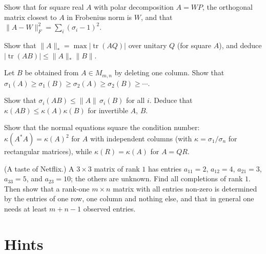 \begin{exercise}[$\star\star$]\label{linear:ex:nearestorth}
Show that for square real $A$ with polar decomposition $A=WP$, the orthogonal matrix closest to $A$ in Frobenius norm is
$W$, and that $\|A-W\|_F^2=\sum_i(\sigma_i-1)^2$.
\end{exercise}

\begin{exercise}[$\star\star$]\label{linear:ex:nuclear}
Show that $\|A\|_*=\max|\operatorname{tr}(AQ)|$ over unitary $Q$ (for square $A$), and deduce $|\operatorname{tr}(AB)|\le\|A\|_*
\|B\|$.
\end{exercise}

\begin{exercise}[$\star\star$]\label{linear:ex:svinterlace}
Let $B$ be obtained from $A\in M_{m,n}$ by deleting one column. Show that $\sigma_1(A)\ge\sigma_1(B)\ge\sigma_2(A)\ge\sigma_2(B)
\ge\cdots$.
\end{exercise}

\begin{exercise}[$\star\star$]\label{linear:ex:svprod}
Show that $\sigma_i(AB)\le\|A\|\,\sigma_i(B)$ for all $i$. Deduce that $\kappa(AB)\le\kappa(A)\kappa(B)$ for invertible $A$,
$B$.
\end{exercise}

\begin{exercise}[$\star\star$]\label{linear:ex:normal2x2}
Show that the normal equations square the condition number: $\kappa(A^*A)=\kappa(A)^2$ for $A$ with independent columns
(with $\kappa=\sigma_1/\sigma_n$ for rectangular matrices), while $\kappa(R)=\kappa(A)$ for $A=QR$.
\end{exercise}

\begin{exercise}[$\star\star\star$]\label{linear:ex:matrixcompletion}
(A taste of Netflix.) A $3\times3$ matrix of rank $1$ has entries $a_{11}=2$, $a_{12}=4$, $a_{21}=3$, $a_{33}=5$, and
$a_{23}=10$; the others are unknown. Find all completions of rank $1$. Then show that a rank-one $m\times n$ matrix with all
entries non-zero is determined by the entries of one row, one column and nothing else, and that in general one needs
at least $m+n-1$ observed entries.
\end{exercise}

\section{Hints}

